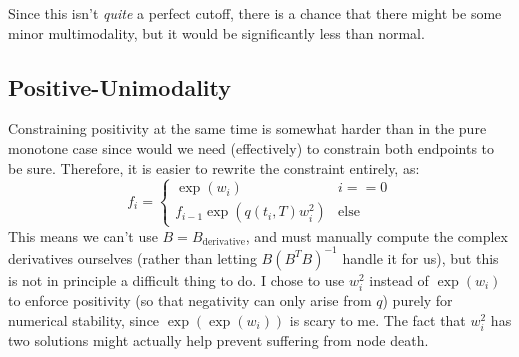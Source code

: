 \documentclass[]{article}
\begin{document}
		Since this isn't \textit{quite} a perfect cutoff, there is a chance that there might be some minor multimodality, but it would be significantly less than normal.

		\subsection{Positive-Unimodality}

			Constraining positivity at the same time is somewhat harder than in the pure monotone case since would we need (effectively) to constrain both endpoints to be sure. Therefore, it is easier to rewrite the constraint entirely, as:
			\begin{equation}
				f_i = \begin{cases} \exp(w_i) & i == 0
					\\
					f_{i-1} \exp(q(t_i,T) w_i^2) & \text{else}
				\end{cases}
			\end{equation} 
			This means we can't use $B = B_\text{derivative}$, and must manually compute the complex derivatives ourselves (rather than letting $B(B^TB)^{-1}$ handle it for us), but this is not in principle a difficult thing to do. I chose to use $w_i^2$ instead of $\exp(w_i)$ to enforce positivity (so that negativity can only arise from $q$) purely for numerical stability, since $\exp(\exp(w_i))$ is scary to me. The fact that $w_i^2$ has two solutions might actually help prevent suffering from node death.
\end{document}
